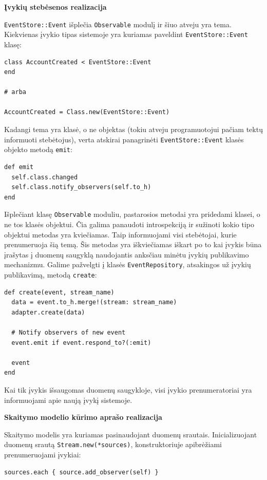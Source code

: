 \textbf{Įvykių stebėsenos realizacija}

\lstinline|EventStore::Event| išplečia \lstinline|Observable| modulį ir šiuo atveju yra tema. Kiekvienas įvykio tipas sistemoje yra kuriamas paveldint \lstinline|EventStore::Event| klasę:

\begin{lstlisting}
class AccountCreated < EventStore::Event
end

# arba

AccountCreated = Class.new(EventStore::Event)
\end{lstlisting}

Kadangi tema yra klasė, o ne objektas (tokiu atveju programuotojui pačiam tektų informuoti stebėtojus), verta atskirai panagrinėti \lstinline|EventStore::Event| klasės objekto metodą \lstinline|emit|:

\begin{lstlisting}
def emit
  self.class.changed
  self.class.notify_observers(self.to_h)
end
\end{lstlisting}

Išplečiant klasę \lstinline|Observable| moduliu, pastarosios metodai yra pridedami klasei, o ne tos klasės objektui. Čia galima panaudoti introspekciją ir sužinoti kokio tipo objektui metodas yra kviečiamas. Taip informuojami visi stebėtojai, kurie prenumeruoja šią temą. Šis metodas yra iškviečiamas iškart po to kai įvykis būna įrašytas į duomenų saugyklą naudojantis anksčiau minėtu įvykių publikavimo mechanizmu. Galime pažvelgti į klasės \lstinline|EventRepository|, atsakingos už įvykių publikavimą, metodą \lstinline|create|:

\begin{lstlisting}
def create(event, stream_name)
  data = event.to_h.merge!(stream: stream_name)
  adapter.create(data)

  # Notify observers of new event
  event.emit if event.respond_to?(:emit)

  event
end
\end{lstlisting}

Kai tik įvykis išsaugomas duomenų saugykloje, visi įvykio prenumeratoriai yra informuojami apie naują įvykį sistemoje.

\textbf{Skaitymo modelio kūrimo aprašo realizacija}

Skaitymo modelis yra kuriamas pasinaudojant duomenų srautais. Inicializuojant duomenų srautą \lstinline|Stream.new(*sources)|, konstruktoriuje apibrėžiami prenumeruojami įvykiai:

\begin{lstlisting}
sources.each { source.add_observer(self) }
\end{lstlisting}

